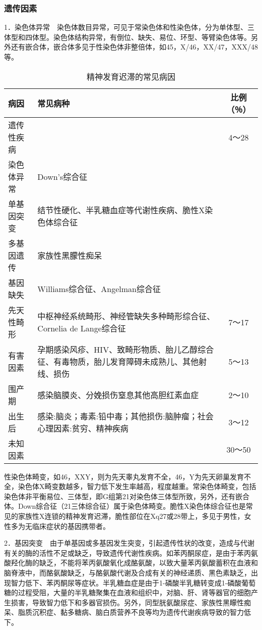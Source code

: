 \subsubsection{遗传因素}

1．染色体异常　染色体数目异常，可见于常染色体和性染色体，分为单体型、三体型和四体型。染色体结构异常，有倒位、缺失、易位、环型、等臂染色体等。另外还有嵌合体，嵌合体多见于性染色体非整倍体，如45，X/46，XX/47，XXX/48等。

\begin{table}[ht]
    \caption{精神发育迟滞的常见病因}
    \label{tab16-1}
    \centering
    \begin{tabular}{lp{8cm}c}
    \toprule
    病因 & 常见病种 & 比例（％） \\
    \midrule
    遗传性疾病 & & 4～28 \\
\quad 染色体异常 & Down's综合征& \\
\quad 单基因突变 & 结节性硬化、半乳糖血症等代谢性疾病、脆性X染
色体综合征 &\\
\quad 多基因遗传 & 
家族性黑朦性痴呆 & \\
\quad 基因缺失 &
 Williams综合征、Angelman综合征 &\\
先天性畸形 & 
中枢神经系统畸形、神经管缺失多种畸形综合征、Cornelia de Lange综合征 & 
7～17 \\
有害因素 & 
孕期感染风疹、HIV、致畸形物质、胎儿乙醇综合
征、有毒物质，胎儿发育障碍未成熟儿、其他射线、损伤 & 5～13\\
围产期 & 
感染脑膜炎、分娩损伤窒息其他高胆红素血症 & 
2～10\\
出生后 & 
感染:脑炎；毒素:铅中毒；其他损伤:脑肿瘤；社会
心理因素:贫穷、精神疾病 & 3～12\\
未知因素 & &
30～50 \\
    \bottomrule
    \end{tabular}
\end{table}


性染色体畸变，如46，XXY，则为先天睾丸发育不全，46，Y为先天卵巢发育不全，染色体X畸变数越多，智力低下发生率越高，程度越重。常染色体畸变，包括染色体非平衡易位、三体型，即G组第21对染色体三体型所致，另外，还有嵌合体。Down综合征（21三体综合征）属于染色体畸变。脆性X染色体综合征也是常见的家族性X连锁的精神发育迟滞，脆性部位在Xq27或28带上，多见于男性，女性多为无临床症状的基因携带者。

2．基因突变　由于单基因或多基因发生突变，引起遗传性状的改变，造成与代谢有关的酶的活性不足或缺乏，导致遗传代谢性疾病。如苯丙酮尿症，是由于苯丙氨酸羟化酶的缺乏，不能将苯丙氨酸氧化成酪氨酸，以致大量苯丙氨酸蓄积在血液和脑脊液中，而酪氨酸缺乏，与酪氨酸代谢及合成有关的神经递质、黑色素缺乏，出现智力低下、苯丙酮尿等症状。半乳糖血症是由于1-磷酸半乳糖转变成1-磷酸葡萄糖的过程受阻，大量的半乳糖聚集在血液和组织中，对脑、肝、肾等器官的细胞产生损害，导致智力低下和多器官损伤。另外，同型胱氨酸尿症、家族性黑矇性痴呆、脂质沉积症、黏多糖病、脑白质营养不良等均为遗传代谢疾病导致的智力低下。

